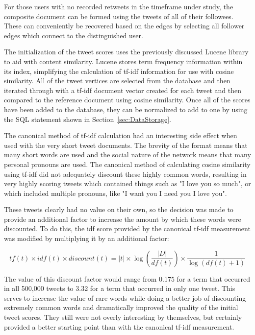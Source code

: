 For those users with no recorded retweets in the timeframe under study, the composite document can be formed using the tweets of all of their followees. These can conveniently be recovered based on the edges by selecting all follower edges which connect to the distinguished user.

The initialization of the tweet scores uses the previously discussed Lucene library to aid with content similarity. Lucene stores term frequency information within its index, simplifying the calculation of tf-idf information for use with cosine similarity. All of the tweet vertices are selected from the database and then iterated through with a tf-idf document vector created for each tweet and then compared to the reference document using cosine similarity. Once all of the scores have been added to the database, they can be normalized to add to one by using the SQL statement shown in Section~\ref{sec:DataStorage}.

The canonical method of tf-idf calculation had an interesting side effect when used with the very short tweet documents. The brevity of the format means that many short words are used and the social nature of the network means that many personal pronouns are used. The canonical method of calculating cosine similarity using tf-idf did not adequately discount these highly common words, resulting in very highly scoring tweets which contained things such as "I love you so much", or which included multiple pronouns, like "I want you I need you I love you".

These tweets clearly had no value on their own, so the decision was made to provide an additional factor to increase the amount by which these words were discounted. To do this, the idf score provided by the canonical tf-idf measurement was modified by multiplying it by an additional factor:

\begin{center}
\[
tf(t) \times idf(t) \times discount(t) = |t| \times \log(\frac{|D|}{df(t)}) \times \frac{1}{\log(df(t) + 1)}
\]
\end{center}

The value of this discount factor would range from 0.175 for a term that occurred in all 500,000 tweets to 3.32 for a term that occurred in only one tweet. This serves to increase the value of rare words while doing a better job of discounting extremely common words and dramatically improved the quality of the initial tweet scores. They still were not overly interesting by themselves, but certainly provided a better starting point than with the canonical tf-idf measurement.


